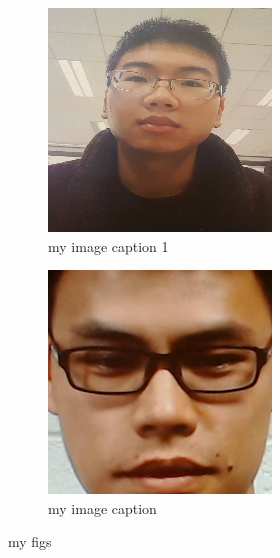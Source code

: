 \documentclass[a4paper,twocolumn]{article}
\begin{document}
\begin{figure}
	\begin{subfigure} {0.22\textwidth}
		\includegraphics[width=\linewidth, angle=0,]{1_1_09_2f_37.png}
		\caption{my image caption 1}
		\label{fig gggggg}
		
	\end{subfigure}%
	\begin{subfigure} {0.22\textwidth}
		\includegraphics[width=\linewidth, angle=0,]{129-2-3-3-1f_385.png}
		\caption{my image caption}
		
	\end{subfigure}
	\caption{my figs}
\end{figure}
\end{document}
